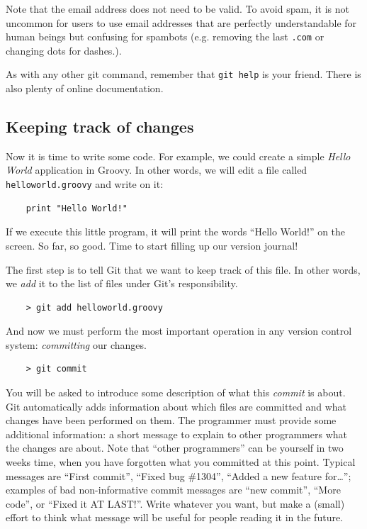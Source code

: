 Note that the email address does not need to be valid. To avoid spam,
it is not uncommon for users to use email addresses that are perfectly
understandable for human beings but confusing for spambots
(e.g. removing the last \verb+.com+ or changing dots for dashes.).

As with any other git command, remember that \verb+git help+ is your
friend. There is also plenty of online documentation. 

\subsection{Keeping track of changes}
\label{sec:keep-track-chang}

Now it is time to write some code. For example, we could create a
simple \emph{Hello World} application in Groovy. In other words, we
will edit a file called \verb+helloworld.groovy+ and write on it:

\begin{verbatim}
    print "Hello World!"
\end{verbatim}

If we execute this little program, it will print the words ``Hello
World!'' on the screen. So far, so good. Time to start filling up our
version journal! 

The first step is to tell Git that we want to keep track of this
file. In other words, we \emph{add} it to the list of files under
Git's responsibility. 

\begin{verbatim}
    > git add helloworld.groovy
\end{verbatim}

And now we must perform the most important operation in any version control
system: \emph{committing} our changes. 

\begin{verbatim}
    > git commit
\end{verbatim}

You will be asked to introduce some description of what this \emph{commit}
is about. Git automatically adds information about which files are
committed and what changes have been performed on them. The programmer
must provide some additional information: a short message to explain
to other programmers what the changes are about. Note that ``other
programmers'' can be yourself in two weeks time, when you have
forgotten what you committed at this point. Typical messages are
``First commit'', ``Fixed bug \#1304'', ``Added a new feature
for\ldots''; examples of bad non-informative commit messages are ``new
commit'', ``More code'', or ``Fixed it AT LAST!''. Write whatever you
want, but make a (small) effort to think what message will be useful
for people reading it in the future.

